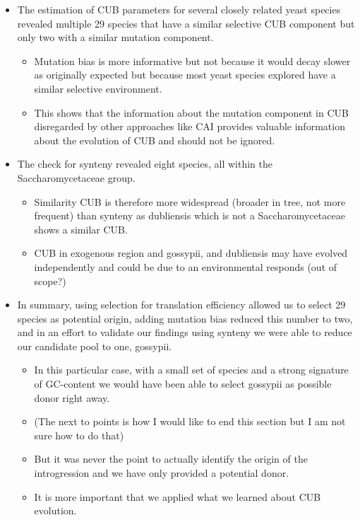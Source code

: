 \documentclass[12pt]{article}
\begin{document}
\begin{itemize}
\begin{itemize}
\begin{itemize}
		\end{itemize}
		\item The estimation of CUB parameters for several closely related yeast species revealed multiple 29 species that have a similar selective CUB component but only two with a similar mutation component.
		\begin{itemize}
			\item Mutation bias is more informative but not because it would decay slower as originally expected but because most yeast species explored have a similar selective environment.
			\item This shows that the information about the mutation component in CUB disregarded by other approaches like CAI provides valuable information about the evolution of CUB and should not be ignored.
		\end{itemize}
		\item The check for synteny revealed eight species, all within the Saccharomycetaceae group.
		\begin{itemize}
			\item Similarity CUB is therefore more widespread (broader in tree, not more frequent) than synteny as dubliensis which is not a Saccharomycetaceae shows a similar CUB.
			\item CUB in exogenous region and gossypii, and dubliensis may have evolved independently and could be due to an environmental responds (out of scope?) 
		\end{itemize} 
		\item In summary, using selection for translation efficiency allowed us to select 29 species as potential origin, adding mutation bias reduced this number to two, and in an effort to validate our findings using synteny we were able to reduce our candidate pool to one, gossypii. 
		\begin{itemize}
			\item In this particular case, with a small set of species and a strong signature of GC-content we would have been able to select gossypii as possible donor right away.
			\item (The next to points is how I would like to end this section but I am not sure how to do that)
			\item But it was never the point to actually identify the origin of the introgression and we have only provided a potential donor.
			\item It is more important that we applied what we learned about CUB evolution.
		\end{itemize}

\end{itemize}
\end{itemize}
\end{document}
